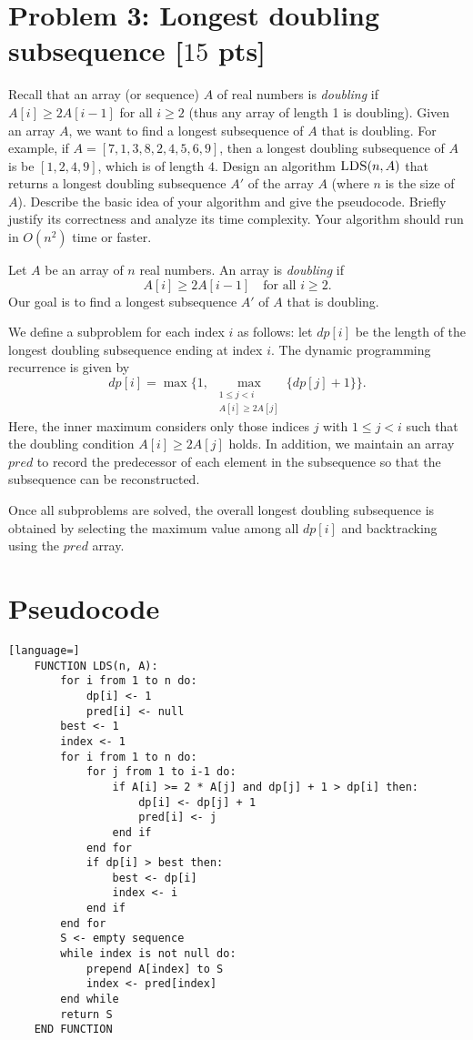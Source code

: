 \documentclass[letterpaper, 11pt]{article}
\newcommand{\1}{\mathds{1}}	%
\theoremstyle{definition}
\newcommand{\problem}[1]{\section*{Problem #1}}
\newenvironment{solution}{{\par\noindent\it Solution.}}{}
\begin{document}
\problem{3: Longest doubling subsequence [$15$ pts]}
Recall that an array (or sequence) $A$ of real numbers is \textit{doubling} if $A[i] \geq 2A[i-1]$ for all $i \geq 2$ (thus any array of length 1 is doubling).
Given an array $A$, we want to find a longest subsequence of $A$ that is doubling.
For example, if $A = [7,1,3,8,2,4,5,6,9]$, then a longest doubling subsequence of $A$ is be $[1,2,4,9]$, which is of length $4$.
Design an algorithm $\textsc{LDS}(n,A)$ that returns a longest doubling subsequence $A'$ of the array $A$ (where $n$ is the size of $A$).
Describe the basic idea of your algorithm and give the pseudocode.
Briefly justify its correctness and analyze its time complexity.
Your algorithm should run in $O(n^2)$ time or faster.


    
\begin{solution}
    Let $A$ be an array of $n$ real numbers. An array is \textit{doubling} if 
    \[
    A[i] \geq 2A[i-1] \quad \text{for all } i \ge 2.
    \]
    Our goal is to find a longest subsequence $A'$ of $A$ that is doubling. 
    
    We define a subproblem for each index $i$ as follows: let $dp[i]$ be the length of the longest doubling subsequence ending at index $i$. The dynamic programming recurrence is given by
    \[
    dp[i] = \max\!\Biggl\{ 1,\ \max_{\substack{1 \leq j < i \\ A[i] \geq 2A[j]}} \bigl\{ dp[j] + 1 \bigr\} \Biggr\}.
    \]
    Here, the inner maximum considers only those indices $j$ with $1 \leq j < i$ such that the doubling condition $A[i] \ge 2A[j]$ holds. In addition, we maintain an array $pred$ to record the predecessor of each element in the subsequence so that the subsequence can be reconstructed.
    
    Once all subproblems are solved, the overall longest doubling subsequence is obtained by selecting the maximum value among all $dp[i]$ and backtracking using the $pred$ array.
    
    \section*{Pseudocode}
    
    \begin{lstlisting}[language=]
    FUNCTION LDS(n, A):
        for i from 1 to n do:
            dp[i] <- 1
            pred[i] <- null
        best <- 1
        index <- 1
        for i from 1 to n do:
            for j from 1 to i-1 do:
                if A[i] >= 2 * A[j] and dp[j] + 1 > dp[i] then:
                    dp[i] <- dp[j] + 1
                    pred[i] <- j
                end if
            end for
            if dp[i] > best then:
                best <- dp[i]
                index <- i
            end if
        end for
        S <- empty sequence
        while index is not null do:
            prepend A[index] to S
            index <- pred[index]
        end while
        return S
    END FUNCTION
    \end{lstlisting}


\end{solution}
\end{document}
